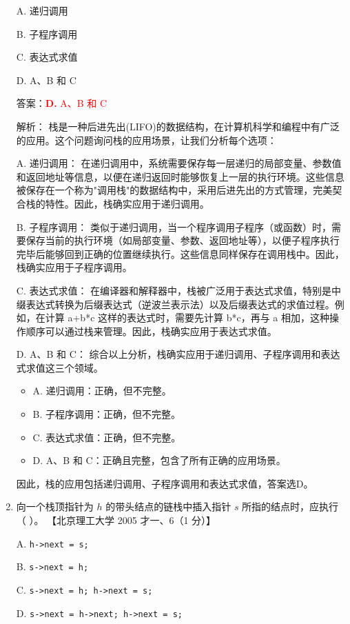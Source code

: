 \documentclass[lang=cn,newtx,10pt,scheme=chinese]{../../../elegantbook}
\begin{document}
\begin{enumerate}
    A. 递归调用  

    B. 子程序调用  

    C. 表达式求值  

    D. A、B 和 C  

    答案：\textcolor{red}{\textbf{D.} A、B 和 C}

    解析：
    栈是一种后进先出(LIFO)的数据结构，在计算机科学和编程中有广泛的应用。这个问题询问栈的应用场景，让我们分析每个选项：

    A. 递归调用：
    在递归调用中，系统需要保存每一层递归的局部变量、参数值和返回地址等信息，以便在递归返回时能够恢复上一层的执行环境。这些信息被保存在一个称为"调用栈"的数据结构中，采用后进先出的方式管理，完美契合栈的特性。因此，栈确实应用于递归调用。

    B. 子程序调用：
    类似于递归调用，当一个程序调用子程序（或函数）时，需要保存当前的执行环境（如局部变量、参数、返回地址等），以便子程序执行完毕后能够回到正确的位置继续执行。这些信息同样保存在调用栈中。因此，栈确实应用于子程序调用。

    C. 表达式求值：
    在编译器和解释器中，栈被广泛用于表达式求值，特别是中缀表达式转换为后缀表达式（逆波兰表示法）以及后缀表达式的求值过程。例如，在计算 a+b*c 这样的表达式时，需要先计算 b*c，再与 a 相加，这种操作顺序可以通过栈来管理。因此，栈确实应用于表达式求值。

    D. A、B 和 C：
    综合以上分析，栈确实应用于递归调用、子程序调用和表达式求值这三个领域。

    \begin{itemize}
        \item A. 递归调用：正确，但不完整。
        \item B. 子程序调用：正确，但不完整。
        \item C. 表达式求值：正确，但不完整。
        \item D. A、B 和 C：正确且完整，包含了所有正确的应用场景。
    \end{itemize}

    因此，栈的应用包括递归调用、子程序调用和表达式求值，答案选D。

    \item 向一个栈顶指针为 $h$ 的带头结点的链栈中插入指针 $s$ 所指的结点时，应执行（ ）。  
    【北京理工大学 2005 才一、6（1 分）】  

    A. \texttt{h->next = s;}  
    
    B. \texttt{s->next = h;}  

    C. \texttt{s->next = h; h->next = s;}  

    D. \texttt{s->next = h->next; h->next = s;}  


\end{enumerate}
\end{document}
